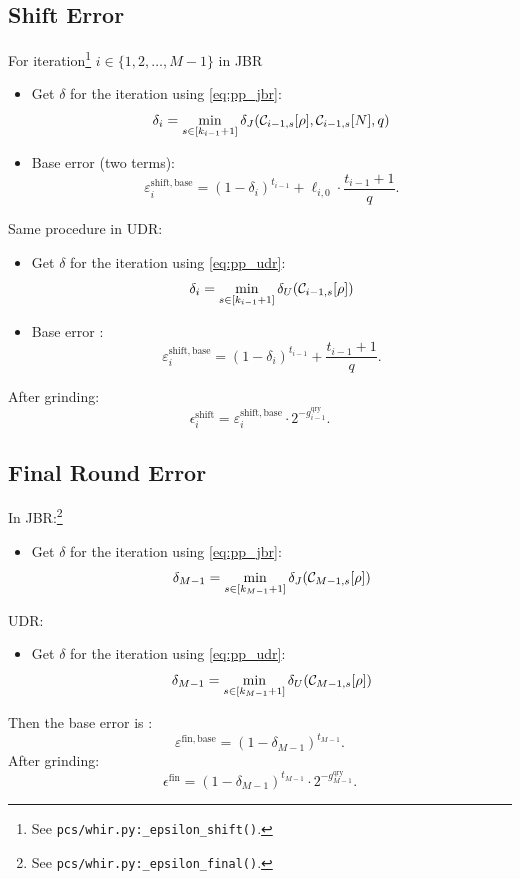 \subsection{Shift Error}

For iteration\footnote{See \texttt{pcs/whir.py:\_epsilon\_shift()}.} \(i\in\{1,2,\ldots,M-1\}\) in JBR
\begin{itemize}
    \item   Get $\delta$ for the iteration using \eqref{eq:pp_jbr}:
    $$
    \delta_i =\min_{s\in[k_{i-1}+1]}\delta_J(\mathcal{C}_{i-1,s}[\rho],\mathcal{C}_{i-1,s}[N],q)
    $$
\item Base error (two terms):
\[
  \varepsilon^{\mathrm{shift,base}}_i
    = (1 - \delta_i )^{t_{i-1}}
      + \ell_{i,0} \cdot \frac{t_{i-1} + 1}{  q}.
\]

\end{itemize}

Same procedure in UDR:
\begin{itemize}
    \item   Get $\delta$ for the iteration using \eqref{eq:pp_udr}:
    $$
    \delta_i =\min_{s\in[k_{i-1}+1]}\delta_U(\mathcal{C}_{i-1,s}[\rho])
    $$
\item Base error  :
\[
  \varepsilon^{\mathrm{shift,base}}_i
    = (1 - \delta_i )^{t_{i-1}}
      +   \frac{t_{i-1} + 1}{q}.
\]

\end{itemize}

 After grinding:
\[
  \epsilon^{\mathrm{shift}}_i
    = \varepsilon^{\mathrm{shift,base}}_i
      \cdot 2^{-g^{\mathrm{qry}}_{i-1}}.
\]


\subsection{Final Round Error}

In JBR:\footnote{See \texttt{pcs/whir.py:\_epsilon\_final()}.}
\begin{itemize}
    \item  Get $\delta$ for the iteration using \eqref{eq:pp_jbr}:
    $$
    \delta_{M-1} =\min_{s\in[k_{M-1}+1]}\delta_J(\mathcal{C}_{M-1,s}[\rho])
    $$
\end{itemize}
UDR:
 \begin{itemize}
    \item  Get $\delta$ for the iteration using \eqref{eq:pp_udr}:
    $$
    \delta_{M-1} =\min_{s\in[k_{M-1}+1]}\delta_U(\mathcal{C}_{M-1,s}[\rho])
    $$
\end{itemize}
Then
the base error is :
\[
  \varepsilon^{\mathrm{fin,base}}
    = (1 - \delta_{M-1})^{t_{M-1}}.
\]
After grinding:
\[
  \epsilon^{\mathrm{fin}}
  = (1 - \delta_{M-1})^{t_{M-1}}
    \cdot 2^{-g^{\mathrm{qry}}_{M-1}}.
\]
\newpage

